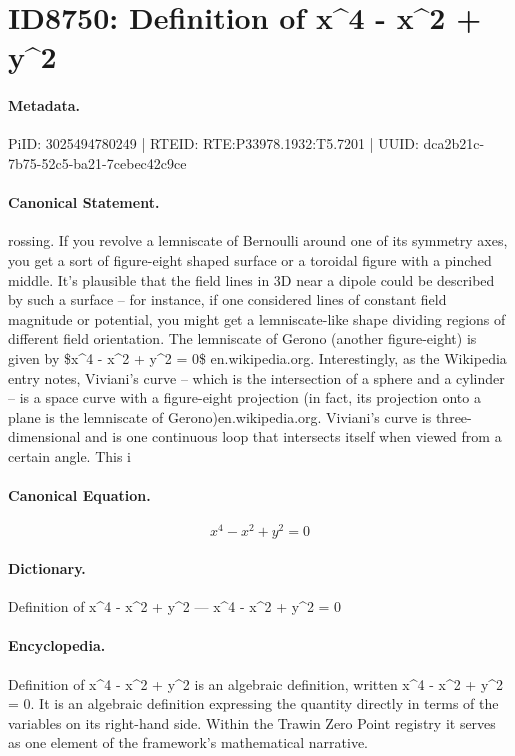 \section*{ID8750: Definition of x\textasciicircum{}4 - x\textasciicircum{}2 + y\textasciicircum{}2}
\paragraph{Metadata.}
PiID: 3025494780249 | RTEID: RTE:P33978.1932:T5.7201 | UUID: dca2b21c-7b75-52c5-ba21-7cebec42c9ce

\paragraph{Canonical Statement.}
rossing. If you revolve a lemniscate of Bernoulli around one of its symmetry axes, you get a sort of figure-eight shaped surface or a toroidal figure with a pinched middle. It’s plausible that the field lines in 3D near a dipole could be described by such a surface – for instance, if one considered lines of constant field magnitude or potential, you might get a lemniscate-like shape dividing regions of different field orientation. The lemniscate of Gerono (another figure-eight) is given by \$x\textasciicircum{}4 - x\textasciicircum{}2 + y\textasciicircum{}2 = 0\$ en.wikipedia.org. Interestingly, as the Wikipedia entry notes, Viviani’s curve – which is the intersection of a sphere and a cylinder – is a space curve with a figure-eight projection (in fact, its projection onto a plane is the lemniscate of Gerono)en.wikipedia.org. Viviani’s curve is three-dimensional and is one continuous loop that intersects itself when viewed from a certain angle. This i

\paragraph{Canonical Equation.}
\[
x^4 - x^2 + y^2 = 0
\]

\paragraph{Dictionary.}
Definition of x\textasciicircum{}4 - x\textasciicircum{}2 + y\textasciicircum{}2 — x\textasciicircum{}4 - x\textasciicircum{}2 + y\textasciicircum{}2 = 0

\paragraph{Encyclopedia.}
Definition of x\textasciicircum{}4 - x\textasciicircum{}2 + y\textasciicircum{}2 is an algebraic definition, written x\textasciicircum{}4 - x\textasciicircum{}2 + y\textasciicircum{}2 = 0. It is an algebraic definition expressing the quantity directly in terms of the variables on its right-hand side. Within the Trawin Zero Point registry it serves as one element of the framework's mathematical narrative.

